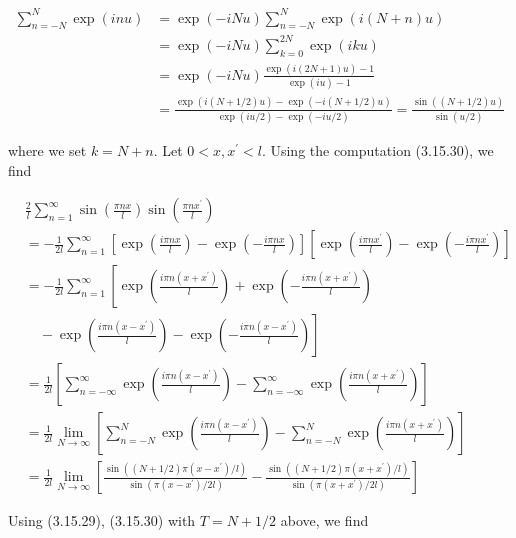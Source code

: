 \documentclass{article}
\begin{document}
\begin{align*}
\sum_{n=-N}^{N} \exp (i n u) & =\exp (-i N u) \sum_{n=-N}^{N} \exp (i(N+n) u)  \tag{3.15.31}\\
& =\exp (-i N u) \sum_{k=0}^{2 N} \exp (i k u) \\
& =\exp (-i N u) \frac{\exp (i(2 N+1) u)-1}{\exp (i u)-1} \\
& =\frac{\exp (i(N+1 / 2) u)-\exp (-i(N+1 / 2) u)}{\exp (i u / 2)-\exp (-i u / 2)}=\frac{\sin ((N+1 / 2) u)}{\sin (u / 2)}
\end{align*}
 
where we set $k=N+n$. Let $0<x, x^{\prime}<l$. Using the computation (3.15.30), we find
 
\begin{align*}
& \frac{2}{l} \sum_{n=1}^{\infty} \sin \left(\frac{\pi n x}{l}\right) \sin \left(\frac{\pi n x^{\prime}}{l}\right)  \tag{3.15.32}\\
&=-\frac{1}{2 l} \sum_{n=1}^{\infty}\left[\exp \left(\frac{i \pi n x}{l}\right)-\exp \left(-\frac{i \pi n x}{l}\right)\right]\left[\exp \left(\frac{i \pi n x^{\prime}}{l}\right)-\exp \left(-\frac{i \pi n x^{\prime}}{l}\right)\right] \\
&=-\frac{1}{2 l} \sum_{n=1}^{\infty}\left[\exp \left(\frac{i \pi n\left(x+x^{\prime}\right)}{l}\right)+\exp \left(-\frac{i \pi n\left(x+x^{\prime}\right)}{l}\right)\right. \\
&\left.\quad-\exp \left(\frac{i \pi n\left(x-x^{\prime}\right)}{l}\right)-\exp \left(-\frac{i \pi n\left(x-x^{\prime}\right)}{l}\right)\right] \\
&= \frac{1}{2 l}\left[\sum_{n=-\infty}^{\infty} \exp \left(\frac{i \pi n\left(x-x^{\prime}\right)}{l}\right)-\sum_{n=-\infty}^{\infty} \exp \left(\frac{i \pi n\left(x+x^{\prime}\right)}{l}\right)\right] \\
&=\frac{1}{2 l} \lim _{N \rightarrow \infty}\left[\sum_{n=-N}^{N} \exp \left(\frac{i \pi n\left(x-x^{\prime}\right)}{l}\right)-\sum_{n=-N}^{N} \exp \left(\frac{i \pi n\left(x+x^{\prime}\right)}{l}\right)\right] \\
&=\frac{1}{2 l} \lim _{N \rightarrow \infty}\left[\frac{\sin \left((N+1 / 2) \pi\left(x-x^{\prime}\right) / l\right)}{\sin \left(\pi\left(x-x^{\prime}\right) / 2 l\right)}-\frac{\sin \left((N+1 / 2) \pi\left(x+x^{\prime}\right) / l\right)}{\sin \left(\pi\left(x+x^{\prime}\right) / 2 l\right)}\right]
\end{align*}
 

Using (3.15.29), (3.15.30) with $T=N+1 / 2$ above, we find
 
\end{document}
